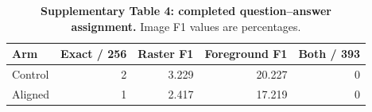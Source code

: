 \begin{table}[htbp]\centering\small
\caption*{\textbf{Supplementary Table 4: completed question--answer assignment.} Image F1 values are percentages.}
\begin{tabular}{lrrrr}\toprule
Arm & Exact / 256 & Raster F1 & Foreground F1 & Both / 393\\\midrule
Control & 2 & 3.229 & 20.227 & 0\\
Aligned & 1 & 2.417 & 17.219 & 0\\\bottomrule
\end{tabular}
\end{table}
